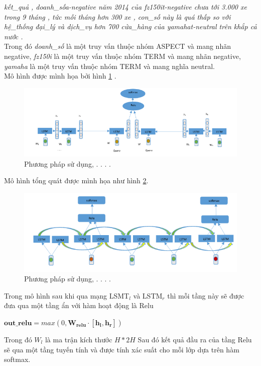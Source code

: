 \documentclass[fontsize=12pt]{scrartcl}
\begin{document}
\textit{kết\_quả , doanh\_số{a-negative} năm 2014 của fz150i{t-negative} chưa tới 3.000 xe trong 9 tháng , tức mỗi tháng hơn 300 xe , con\_số này là quá thấp so với hệ\_thống đại\_lý và dịch\_vụ hơn 700 cửa\_hàng của yamaha{t-neutral} trên khắp cả nước .\\}
Trong đó \textit{doanh\_số } là một truy vấn thuộc nhóm ASPECT và mang nhãn negative, \textit{fz150i} là một truy vấn thuộc nhóm TERM và mang nhãn negative, \textit{yamaha} là một truy vấn thuộc nhóm TERM và mang nghĩa neutral.\\
Mô hình được mình họa bởi hình \ref{img_my_model1}
.
\begin{figure}
     \includegraphics[width=\textwidth]{img/my_model1}
      \caption{Phương pháp sử dụng, . . . . }
       \label{img_my_model1}
\end{figure}
\par
Mô hình tổng quát được mình họa như hình \ref{img_my_model2}.
\begin{figure}
     \includegraphics[width=\textwidth]{img/my_model2}
      \caption{Phương pháp sử dụng, . . . . }
       \label{img_my_model2}
\end{figure}
Trong mô hình sau khi qua mạng LSMT$_{l}$ và LSTM$_{r}$ thì mỗi tầng này sẽ được đưa qua một tầng ẩn với hàm hoạt động là Relu
\begin{center}
$\boldsymbol{out\_relu} = max(0,\boldsymbol{W_{relu}}\cdot [\boldsymbol{h_l},\boldsymbol{h_r}])$\\
\end{center}
Trong đó $W_l$ là ma trận kích thước $H*2H$
Sau đó kết quả đầu ra của tầng Relu sẽ qua một tầng tuyến tính và được tính xác suất cho mỗi lớp dựa trên hàm softmax.\\
\end{document}
